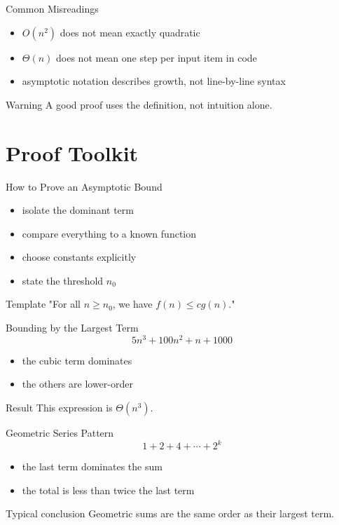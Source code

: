 \documentclass[aspectratio=169,xcolor=dvipsnames]{beamer}
\begin{document}
\begin{frame}{Common Misreadings}
  \begin{itemize}
    \item $O(n^2)$ does not mean exactly quadratic
    \item $\Theta(n)$ does not mean one step per input item in code
    \item asymptotic notation describes growth, not line-by-line syntax
  \end{itemize}
  \begin{alertblock}{Warning}
    A good proof uses the definition, not intuition alone.
  \end{alertblock}
\end{frame}

\section{Proof Toolkit}
\begin{frame}{How to Prove an Asymptotic Bound}
  \begin{itemize}
    \item isolate the dominant term
    \item compare everything to a known function
    \item choose constants explicitly
    \item state the threshold $n_0$
  \end{itemize}
  \begin{block}{Template}
    "For all $n \ge n_0$, we have $f(n) \le c g(n)$."
  \end{block}
\end{frame}

\begin{frame}{Bounding by the Largest Term}
  \[
    5n^3 + 100n^2 + n + 1000
  \]
  \begin{itemize}
    \item the cubic term dominates
    \item the others are lower-order
  \end{itemize}
  \begin{block}{Result}
    This expression is $\Theta(n^3)$.
  \end{block}
\end{frame}

\begin{frame}{Geometric Series Pattern}
  \[
    1 + 2 + 4 + \cdots + 2^{k}
  \]
  \begin{itemize}
    \item the last term dominates the sum
    \item the total is less than twice the last term
  \end{itemize}
  \begin{block}{Typical conclusion}
    Geometric sums are the same order as their largest term.
  \end{block}
\end{frame}
\end{document}
